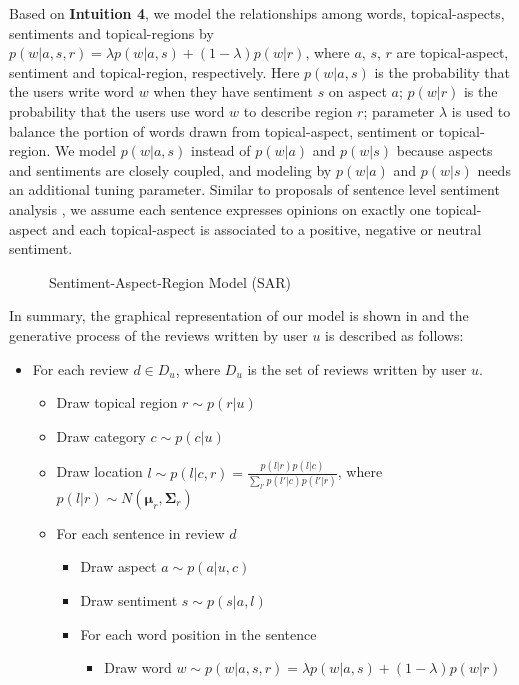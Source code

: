 Based on \textbf{Intuition 4},
we model the relationships among words, topical-aspects,
sentiments and topical-regions by
$p(w|a,s,r)=\lambda p(w|a,s)+(1-\lambda) p(w|r)$, where
$a$, $s$, $r$ are topical-aspect, sentiment and
topical-region, respectively.
Here $p(w|a,s)$ is the probability that the users write
word $w$ when they have sentiment $s$ on aspect $a$;
$p(w|r)$ is the probability that the users use word
$w$ to describe region $r$; parameter
$\lambda$ is used to balance the portion of
words drawn from topical-aspect, sentiment or topical-region.
We model $p(w|a,s)$ instead of $p(w|a)$ and $p(w|s)$
because aspects and sentiments are closely coupled,
and modeling by $p(w|a)$ and $p(w|s)$
needs an additional tuning parameter.
Similar to proposals of sentence level sentiment analysis
\cite{TitovMGLDA:2008,TitovMAS:2008, JoASUM:2011},
we assume each sentence expresses opinions on exactly one topical-aspect
and each topical-aspect is associated to a positive, negative or neutral sentiment.

\begin{figure}[th]
\centering
{}
\caption{Sentiment-Aspect-Region Model (SAR)}
\label{fig:model}
\end{figure}

In summary, the graphical representation of our model
is shown in  and
the generative process of the
reviews written by user $u$ is described as follows:
\begin{itemize}
\item For each review $d\in D_u$, where $D_u$ is the set of reviews written by user $u$.
    \begin{itemize}
    \item Draw topical region $r\sim p(r|u)$
    \item Draw category $c\sim p(c|u)$
    \item Draw location $l\sim p(l|c,r)=\frac{p(l|r)p(l|c)}{\sum_{l'}{p(l'|c)p(l'|r)}}$, where $p(l|r)\sim N(\boldsymbol{\mu}_r,\boldsymbol{\Sigma}_r)$
    \item For each sentence in review $d$
        \begin{itemize}
        \item Draw aspect $a\sim p(a|u,c)$
        \item Draw sentiment $s\sim p(s|a,l)$
        \item For each word position in the sentence
            \begin{itemize}
            \item Draw word $w\sim p(w|a,s,r)={\lambda}p(w|a,s)+(1-\lambda)p(w|r)$
            \end{itemize}
        \end{itemize}
    \end{itemize}
\end{itemize}

